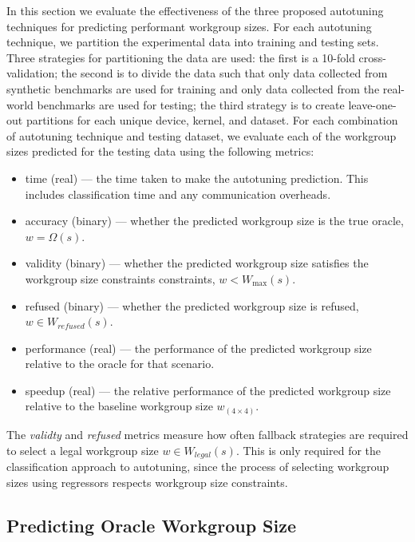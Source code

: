  In this section we evaluate the effectiveness of the three proposed
  autotuning techniques for predicting performant workgroup sizes. For
  each autotuning technique, we partition the experimental data into
  training and testing sets. Three strategies for partitioning the data
  are used: the first is a 10-fold cross-validation; the second is to
  divide the data such that only data collected from synthetic
  benchmarks are used for training and only data collected from the
  real-world benchmarks are used for testing; the third strategy is to
  create leave-one-out partitions for each unique device, kernel, and
  dataset. For each combination of autotuning technique and testing
  dataset, we evaluate each of the workgroup sizes predicted for the
  testing data using the following metrics:
  \begin{itemize}
    \item time (real) --- the time taken to make the autotuning
    prediction. This includes classification time and any communication
    overheads.
    \item accuracy (binary) --- whether the predicted workgroup size is
    the true oracle, $w = \Omega(s)$.
    \item validity (binary) --- whether the predicted workgroup size
    satisfies the workgroup size constraints constraints,
    $w < W_{\max}(s)$.
    \item refused (binary) --- whether the predicted workgroup size is
    refused, $w \in W_{refused}(s)$.
    \item performance (real) --- the performance of the predicted
    workgroup size relative to the oracle for that scenario.
    \item speedup (real) --- the relative performance of the predicted
    workgroup size relative to the baseline workgroup size
    $w_{(4 \times 4)}$.
  \end{itemize}
  The \emph{validty} and \emph{refused} metrics measure how often
  fallback strategies are required to select a legal workgroup size
  $w \in W_{legal}(s)$. This is only required for the classification
  approach to autotuning, since the process of selecting workgroup sizes
  using regressors respects workgroup size constraints.


  \subsection{Predicting Oracle Workgroup Size}

